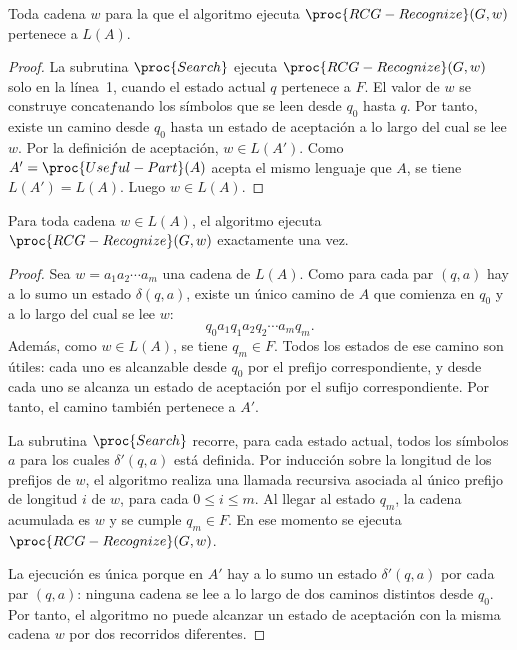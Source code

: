 \begin{lema}
\label{lema:sonido-automata}
Toda cadena $w$ para la que el algoritmo ejecuta
$\proc{RCG-Recognize}(G,w)$ pertenece a $L(A)$.
\end{lema}

\begin{proof}
La subrutina $\proc{Search}$ ejecuta $\proc{RCG-Recognize}(G,w)$ solo en
la línea~1, cuando el estado actual $q$ pertenece a $F$. El valor de $w$
se construye concatenando los símbolos que se leen desde $q_0$ hasta
$q$. Por tanto, existe un camino desde $q_0$ hasta un estado de
aceptación a lo
largo del cual se lee $w$. Por la definición de aceptación,
$w \in L(A')$. Como $A'=\proc{Useful-Part}(A)$ acepta el mismo lenguaje
que $A$, se tiene $L(A')=L(A)$. Luego $w \in L(A)$.
\end{proof}

\begin{lema}
\label{lema:completo-automata}
Para toda cadena $w \in L(A)$, el algoritmo ejecuta
$\proc{RCG-Recognize}(G,w)$ exactamente una vez.
\end{lema}

\begin{proof}
Sea $w=a_1a_2\cdots a_m$ una cadena de $L(A)$. Como para cada par
$(q,a)$ hay a lo sumo un estado $\delta(q,a)$, existe un único camino de
$A$ que comienza en $q_0$ y a lo largo del cual se lee $w$:
\[
  q_0 a_1 q_1 a_2 q_2 \cdots a_m q_m.
\]
Además, como $w \in L(A)$, se tiene $q_m \in F$. Todos los estados de ese
camino son útiles: cada uno es alcanzable desde $q_0$ por el prefijo
correspondiente, y desde cada uno se alcanza un estado de aceptación
por el
sufijo correspondiente. Por tanto, el camino también pertenece a $A'$.

La subrutina $\proc{Search}$ recorre, para cada estado actual, todos los
símbolos $a$ para los cuales $\delta'(q,a)$ está definida. Por inducción
sobre la longitud de los prefijos de $w$, el algoritmo realiza una
llamada recursiva asociada al único prefijo de longitud $i$ de $w$, para
cada $0 \le i \le m$. Al llegar al estado $q_m$, la cadena acumulada es
$w$ y se cumple $q_m \in F$. En ese momento se ejecuta
$\proc{RCG-Recognize}(G,w)$.

La ejecución es única porque en $A'$ hay a lo sumo un estado
$\delta'(q,a)$ por cada par $(q,a)$: ninguna cadena se lee a lo largo
de dos caminos distintos desde $q_0$.
Por tanto, el algoritmo no puede alcanzar un estado de aceptación con
la misma
cadena $w$ por dos recorridos diferentes.
\end{proof}

